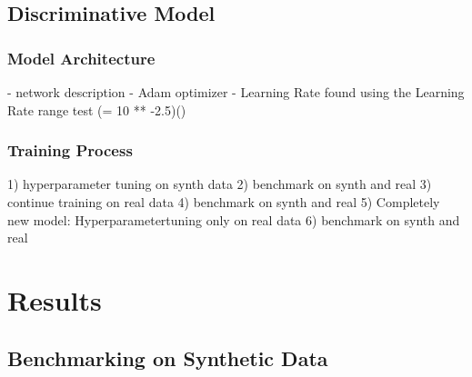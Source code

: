 \documentclass[11pt]{article}
\begin{document}
\subsection{Discriminative Model}
\subsubsection{Model Architecture}
- network description
- Adam optimizer
- Learning Rate found using the Learning Rate range test (= 10 ** -2.5)(\cite{smith2018disciplined})


	
 	

\subsubsection{Training Process}
1) hyperparameter tuning on synth data
2) benchmark on synth and real
3) continue training on real data
4) benchmark on synth and real
5) Completely new model: Hyperparametertuning only on real data
6) benchmark on synth and real

\section{Results}
\subsection{Benchmarking on Synthetic Data}
\end{document}
